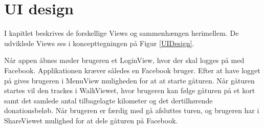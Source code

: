 \thispagestyle{fancy}
\chapter{UI design}

I kapitlet beskrives de forskellige Views og sammenhængen herimellem. De udviklede Views ses i koncepttegningen på Figur \ref{UIDesign}. 

Når appen åbnes møder brugeren et LoginView, hvor der skal logges på med Facebook. Applikationen kræver således en Facebook bruger. Efter at have logget på gives brugeren i MenuView muligheden for at at starte gåturen.  Når gåturen startes vil den trackes i WalkViewet, hvor brugeren kan følge gåturen på et kort samt det samlede antal tilbagelagte kilometer og det dertilhørende donationsbeløb. Når brugeren er færdig med gå afsluttes turen, og brugeren har i ShareViewet mulighed for at dele gåturen på Facebook.   


